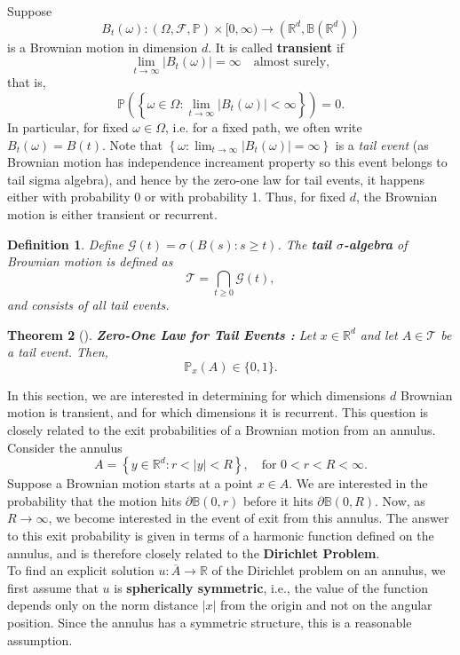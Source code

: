 \documentclass[11pt, a4paper, oneside]{report}
\numberwithin{equation}{section}
\newtheorem{theorem}{Theorem}[chapter]
\newtheorem{definition}[theorem]{Definition}
\newcommand{\F}{\mathscr{F}}
\newcommand{\pp}{\mathbb{P}}
\begin{document}
Suppose 
\[
B_t(\omega) : (\Omega, \F, \pp) \times [0, \infty) \to (\mathbb{R}^d, \mathbb{B}(\mathbb{R}^d))
\]
is a Brownian motion in dimension \( d \). It is called \textbf{transient} if
\[
\lim_{t \to \infty} |B_t(\omega)| = \infty \quad \text{almost surely},
\]
that is,
\[
\pp\left( \left\{ \omega \in \Omega : \lim_{t \to \infty} |B_t(\omega)| < \infty \right\} \right) = 0.
\]
In particular, for fixed \( \omega \in \Omega \), i.e. for a fixed path, we often write \( B_t(\omega) = B(t) \).
Note that  \(
\left\{ \omega :\lim_{t \to \infty} |B_t(\omega)| = \infty \right\}
\) is a \textit{tail event} (as Brownian motion has independence increament property so this event belongs to tail sigma algebra), and hence by the zero-one law for tail events, it happens either with probability 0 or with probability 1. Thus, for fixed \( d \), the Brownian motion is either transient or recurrent.
\begin{definition}
Define \( \mathscr{G}(t) = \sigma(B(s) : s \geq t) \). The \textbf{tail \(\sigma\)-algebra} of Brownian motion  is defined as
\[
\mathscr{T} = \bigcap_{t \geq 0} \mathscr{G}(t),
\]
and consists of all tail events.
\end{definition}
\begin{theorem}[{\cite[Theorem 2.9]{PeresMortersBook}}]
\textbf{Zero-One Law for Tail Events : } Let \( x \in \mathbb{R}^d \) and let \( A \in \mathscr{T} \) be a tail event. Then,
\[
\mathbb{P}_x(A) \in \{0, 1\}.
\]
\end{theorem}
\noindent In this section, we are interested in determining for which dimensions \( d \) Brownian motion is transient, and for which dimensions it is recurrent. This question is closely related to the exit probabilities of a Brownian motion from an annulus.
Consider the annulus
\[
A = \left\{ y \in \mathbb{R}^d : r < |y| < R \right\}, \quad \text{for } 0 < r < R < \infty.
\]
Suppose a Brownian motion starts at a point \( x \in A \). We are interested in the probability that the motion hits \( \partial \mathbb{B}(0, r) \) before it hits \( \partial \mathbb{B}(0, R) \). 
Now, as \( R \to \infty \), we become interested in the event of exit from this annulus. 
The answer to this exit probability is given in terms of a harmonic function defined on the annulus, and is therefore closely related to the \textbf{Dirichlet Problem}. \\
To find an explicit solution \( u : \overline{A} \to \mathbb{R} \) of the Dirichlet problem on an annulus, we first assume that \( u \) is \textbf{spherically symmetric}, i.e., the value of the function depends only on the norm distance \( |x| \) from the origin and not on the angular position. Since the annulus has a symmetric structure, this is a reasonable assumption.
\end{document}
